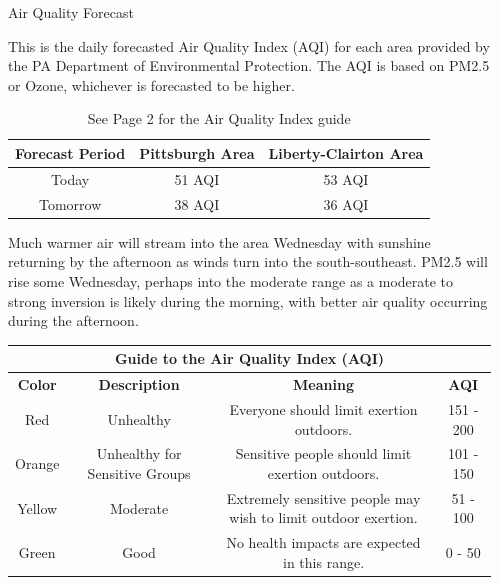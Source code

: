 \documentclass[final]{beamer}
\newlength{\sepwidth}
\newlength{\colwidth}
\newcommand{\separatorcolumn}{\begin{column}{\sepwidth}\end{column}}
\begin{document}
\begin{frame}[t]
\begin{columns}[t]
\separatorcolumn

\begin{column}{\colwidth}

  \begin{block}{Air Quality Forecast}

    This is the daily forecasted Air Quality Index (AQI) for each area provided by the PA Department of Environmental Protection. The AQI is based on PM2.5 or Ozone, whichever is forecasted to be higher.

    \begin{table}
      \renewcommand{\arraystretch}{1.5}
      \centering
      \begin{tabular}{|c| c| c|}
        \hline
        \textbf{Forecast Period} & \textbf{Pittsburgh Area} & \textbf{Liberty-Clairton Area} \\
        \hline
        Today & 51 AQI & 53 AQI \\
        \hline
        Tomorrow & 38 AQI & 36 AQI \\
        \hline
      \end{tabular}
      \caption{See Page 2 for the Air Quality Index guide}
    \end{table}

    Much warmer air will stream into the area Wednesday with sunshine returning by the afternoon as winds turn into the south-southeast. PM2.5 will rise some Wednesday, perhaps into the moderate range as a moderate to strong inversion is likely during the morning, with better air quality occurring during the afternoon.
    
\usepackage[table]{xcolor,colortbl}

    \begin{table}
      \begin{adjustbox}{width=1\textwidth}
      \renewcommand{\arraystretch}{1.5}
      \centering
      \begin{tabular}{|c |c |c |c|}
      \hline
      \multicolumn{4}{|c|}{\textbf{Guide to the Air Quality Index (AQI)}} \\
      \hline
      \textbf{Color} & \textbf{Description} & \textbf{Meaning} & \textbf{AQI} \\
      \hline
      {\cellcolor[HTML]{AA0044}Red} & Unhealthy & Everyone should limit exertion outdoors. & 151 - 200 \\
      Orange & Unhealthy for Sensitive Groups & Sensitive people should limit exertion outdoors. & 101 - 150 \\
      Yellow & Moderate & Extremely sensitive people may wish to limit outdoor exertion. & 51 - 100 \\
      Green & Good & No health impacts are expected in this range. & 0 - 50 \\
      \hline
      \end{tabular}
      \end{adjustbox}
    \end{table}


\end{block}
\end{column}
\end{columns}
\end{frame}
\end{document}
